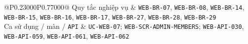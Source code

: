 \begin{longtable}{@{}P{0.23000\SRSWidth}P{0.77000\SRSWidth}@{}}
Quy tắc nghiệp vụ & \texttt{WEB-\allowbreak{}BR-\allowbreak{}07}, \texttt{WEB-\allowbreak{}BR-\allowbreak{}08}, \texttt{WEB-\allowbreak{}BR-\allowbreak{}14}, \texttt{WEB-\allowbreak{}BR-\allowbreak{}15}, \texttt{WEB-\allowbreak{}BR-\allowbreak{}16}, \texttt{WEB-\allowbreak{}BR-\allowbreak{}17}, \texttt{WEB-\allowbreak{}BR-\allowbreak{}27}, \texttt{WEB-\allowbreak{}BR-\allowbreak{}28}, \texttt{WEB-\allowbreak{}BR-\allowbreak{}29} \\[3pt]
Ca sử dụng /\allowbreak{} màn /\allowbreak{} \texttt{API} & \texttt{UC-\allowbreak{}WEB-\allowbreak{}07}; \texttt{WEB-\allowbreak{}SCR-\allowbreak{}ADMIN-\allowbreak{}MEMBERS}; \texttt{WEB-\allowbreak{}API-\allowbreak{}030}, \texttt{WEB-\allowbreak{}API-\allowbreak{}059}, \texttt{WEB-\allowbreak{}API-\allowbreak{}061}, \texttt{WEB-\allowbreak{}API-\allowbreak{}062} \\[3pt]
\end{longtable}
\endgroup


